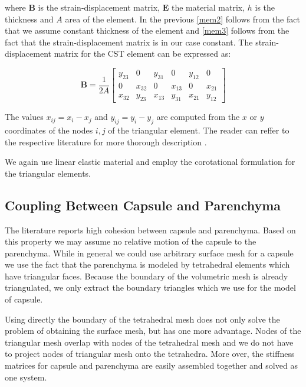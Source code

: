 \documentclass{llncs}
\newcommand{\Mat}[1]{\mathbf{#1}}
\begin{document}
\noindent%
where $\Mat{B}$ is the strain-displacement matrix, $\Mat{E}$ the material
matrix, $h$ is the thickness and $A$ area of the element. In the previous
\eqref{mem2} follows from the fact that we assume constant thickness of the
element and \eqref{mem3} follows from the fact that the strain-displacement
matrix is in our case constant. The strain-displacement matrix for the CST
element can be expressed as:

\begin{equation}
  \Mat{B} = \frac{1}{2A} \begin{bmatrix}
    y_{23} & 0      & y_{31} & 0      & y_{12} & 0 \\
         0 & x_{32} & 0      & x_{13} & 0      & x_{21} \\
    x_{32} & y_{23} & x_{13} & y_{31} & x_{21} & y_{12}
  \end{bmatrix}
\end{equation}

The values $x_{ij} = x_i - x_j$ and $y_{ij} = y_i - y_j$ are computed from
the $x$ or $y$ coordinates of the nodes $i,j$ of the triangular element.
The reader can reffer to the respective literature for more thorough
description \cite{Felippa2003}.

We again use linear elastic material and employ the corotational formulation
for the triangular elements.


\subsection{Coupling Between Capsule and Parenchyma} %

The literature reports high cohesion between capsule and parenchyma.
Based on this
property we may assume no relative motion of the capsule to the parenchyma.
While in general we could use arbitrary surface mesh for a capsule we use
the fact that the parenchyma is modeled by tetrahedral elements which have
triangular faces. Because the boundary of the volumetric mesh is already
triangulated, we only extract the boundary triangles which we use for the
model of capsule.

Using directly the boundary of the tetrahedral mesh does not only solve the
problem of obtaining the surface mesh, but has one more advantage. Nodes
of the triangular mesh overlap with nodes of the tetrahedral mesh and we do
not have to project nodes of triangular mesh onto the tetrahedra. More over,
the stiffness matrices for capsule and parenchyma are easily assembled
together and solved as one system.
\end{document}
